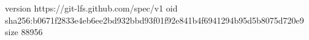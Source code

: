 version https://git-lfs.github.com/spec/v1
oid sha256:b0671f2833e4eb6ee2bd932bbd93f01f92e841b4f6941294b95d5b8075d720e9
size 88956
